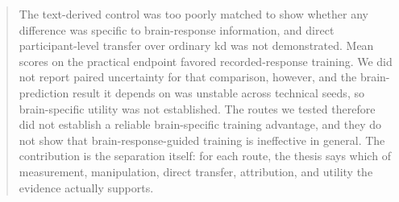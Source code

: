 \documentclass[11pt]{article}
\begin{document}
\begin{abstract}
The text-derived control was too poorly matched to show whether any difference was specific to brain-response information, and direct participant-level transfer over ordinary \ac{kd} was not demonstrated.
Mean scores on the practical endpoint favored recorded-response training.
We did not report paired uncertainty for that comparison, however, and the brain-prediction result it depends on was unstable across technical seeds, so brain-specific utility was not established.
The routes we tested therefore did not establish a reliable brain-specific training advantage, and they do not show that brain-response-guided training is ineffective in general.
The contribution is the separation itself: for each route, the thesis says which of measurement, manipulation, direct transfer, attribution, and utility the evidence actually supports.

\end{abstract}
\acresetall



\FloatBarrier

\FloatBarrier





\appendix



\FloatBarrier




\printbibliography
\end{document}
